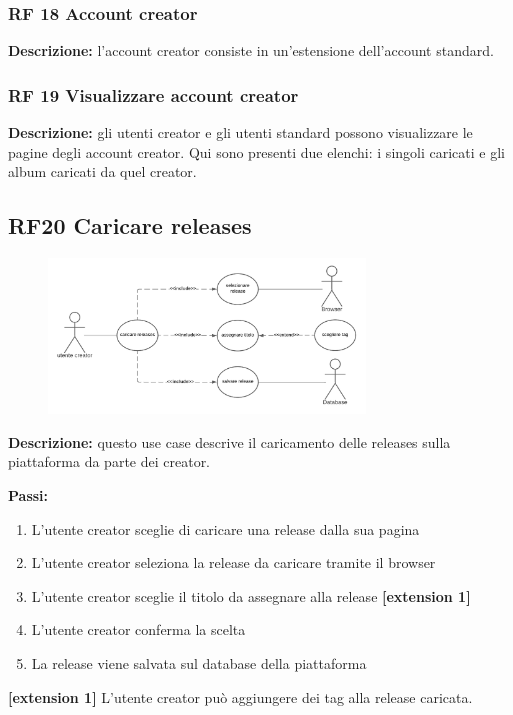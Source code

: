 \documentclass[a4paper,12pt]{article}
\begin{document}
\subsubsection*{RF 18 Account creator}

\textbf{Descrizione:} l’account creator consiste in un'estensione dell'account standard.

\subsubsection*{RF 19 Visualizzare account creator}

\textbf{Descrizione:} gli utenti creator e gli utenti standard possono visualizzare le pagine degli account creator. Qui sono presenti due elenchi: i singoli caricati e gli album caricati da quel creator.

\subsection*{RF20 Caricare releases}

\begin{figure}[htp]
    \centering
    \includegraphics[width=0.75\textwidth]{diagrams/use-case-20.png}
\end{figure}

\textbf{Descrizione:} questo use case descrive il caricamento delle releases sulla piattaforma da parte dei creator.

\textbf{Passi:}
\begin{enumerate}
    \item L’utente creator sceglie di caricare una release dalla sua pagina
    \item L’utente creator seleziona la release da caricare tramite il browser
    \item L’utente creator sceglie il titolo da assegnare alla release \textbf{[extension 1]}
    \item L’utente creator conferma la scelta
    \item La release viene salvata sul database della piattaforma
\end{enumerate}
\textbf{[extension 1]} L’utente creator può aggiungere dei tag alla release caricata.
\end{document}
